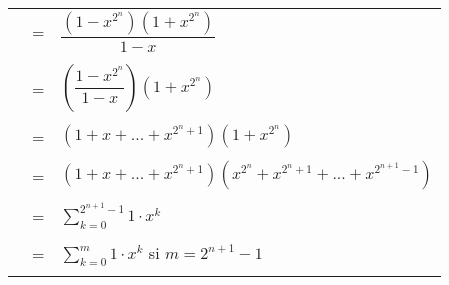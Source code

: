 \begin{enumerate}
\begin{enumerate}[\bfseries (a)]
\begin{center}
\begin{tabular}{r c l}
                            &=&$\dfrac{(1-x^{2^n})(1+x^{2^n})}{1-x}$\\\\
                            &=&$\left( \dfrac{1 - x^{2^n}}{1-x} \right) (1+x^{2^n})$\\\\
                            &=&$(1+x+...+x^{2^n + 1})(1 + x^{2^n})$\\\\
                            &=&$(1+x+...+x^{2^n + 1})(x^{2^n} + x^{2^n +1} + ... + x^{2^{n+1} - 1})$\\\\
                            &=&$\displaystyle\sum_{k=0}^{2^{n+1} - 1} 1 \cdot x^k$\\\\
                            &=&$\displaystyle\sum_{k=0}^{m} 1 \cdot x^k$ si $m = 2^{n+1} - 1$\\\\
                        \end{tabular}
                    \end{center}
            \end{enumerate}

    \end{enumerate}

